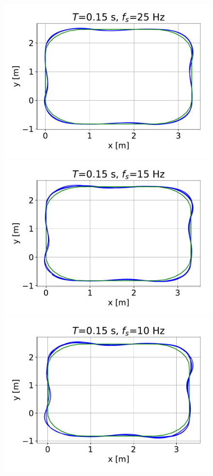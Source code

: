 \documentclass[arbeit=studie,oneside,BCOR=12mm]{ArbeitRST}
\begin{document}
\begin{figure}[h]
    \includegraphics[scale=0.47]{0.15ms25Hz}
    \includegraphics[scale=0.47]{0.15ms15Hz}
    \includegraphics[scale=0.47]{0.15ms10Hz}

\end{figure}
\end{document}
